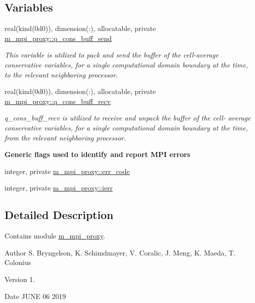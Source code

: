 \subsection*{Variables}
\begin{DoxyCompactItemize}
\item 
real(kind(0d0)), dimension(\+:), allocatable, private \hyperlink{namespacem__mpi__proxy_a67f9b5b69858f72c61b8d8ebf212567d}{m\+\_\+mpi\+\_\+proxy\+::q\+\_\+cons\+\_\+buff\+\_\+send}
\begin{DoxyCompactList}\small\item\em This variable is utilized to pack and send the buffer of the cell-\/average conservative variables, for a single computational domain boundary at the time, to the relevant neighboring processor. \end{DoxyCompactList}\item 
real(kind(0d0)), dimension(\+:), allocatable, private \hyperlink{namespacem__mpi__proxy_a2915932883654eecbac1283ce03be3ba}{m\+\_\+mpi\+\_\+proxy\+::q\+\_\+cons\+\_\+buff\+\_\+recv}
\begin{DoxyCompactList}\small\item\em q\+\_\+cons\+\_\+buff\+\_\+recv is utilized to receive and unpack the buffer of the cell-\/ average conservative variables, for a single computational domain boundary at the time, from the relevant neighboring processor. \end{DoxyCompactList}\end{DoxyCompactItemize}
\begin{Indent}\textbf{ Generic flags used to identify and report M\+PI errors}\par
\begin{DoxyCompactItemize}
\item 
integer, private \hyperlink{namespacem__mpi__proxy_ae5709407e3600d19d79b183e409bb982}{m\+\_\+mpi\+\_\+proxy\+::err\+\_\+code}
\item 
integer, private \hyperlink{namespacem__mpi__proxy_a306ba163b09cfc692125f2c0ba82ef8c}{m\+\_\+mpi\+\_\+proxy\+::ierr}
\end{DoxyCompactItemize}
\end{Indent}


\subsection{Detailed Description}
Contains module \hyperlink{namespacem__mpi__proxy}{m\+\_\+mpi\+\_\+proxy}. 

\begin{DoxyAuthor}{Author}
S. Bryngelson, K. Schimdmayer, V. Coralic, J. Meng, K. Maeda, T. Colonius 
\end{DoxyAuthor}
\begin{DoxyVersion}{Version}
1. 
\end{DoxyVersion}
\begin{DoxyDate}{Date}
J\+U\+NE 06 2019 
\end{DoxyDate}
